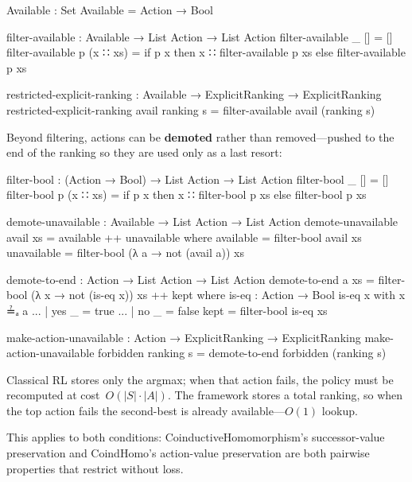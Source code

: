 \documentclass[9pt,a4paper]{article}
\theoremstyle{plain}
\theoremstyle{definition}
\theoremstyle{remark}
\begin{document}
\begin{code}
  Available : Set
  Available = Action → Bool

  filter-available : Available → List Action → List Action
  filter-available _ []       = []
  filter-available p (x ∷ xs) = 
    if p x then x ∷ filter-available p xs else filter-available p xs

  restricted-explicit-ranking : Available → ExplicitRanking → ExplicitRanking
  restricted-explicit-ranking avail ranking s = filter-available avail (ranking s)
\end{code}

\noindent Beyond filtering, actions can be \textbf{demoted} rather than removed---pushed to the end of the ranking so they are used only as a last resort:

\begin{code}
  filter-bool : (Action → Bool) → List Action → List Action
  filter-bool _ [] = []
  filter-bool p (x ∷ xs) =
    if p x then x ∷ filter-bool p xs else filter-bool p xs

  demote-unavailable : Available → List Action → List Action
  demote-unavailable avail xs = available ++ unavailable
    where
      available   = filter-bool avail xs
      unavailable = filter-bool (λ a → not (avail a)) xs
\end{code}

\begin{code}[hide]
  demote-to-end : Action → List Action → List Action
  demote-to-end a xs = filter-bool (λ x → not (is-eq x)) xs ++ kept
    where
      is-eq : Action → Bool
      is-eq x with x ≟ₐ a
      ... | yes _ = true
      ... | no  _ = false
      kept = filter-bool is-eq xs
\end{code}

\begin{code}
  make-action-unavailable : Action → ExplicitRanking → ExplicitRanking
  make-action-unavailable forbidden ranking s = demote-to-end forbidden (ranking s)
\end{code}

\noindent Classical RL stores only the argmax; when that action fails, the policy must be recomputed at cost~$O(|S| \cdot |A|)$.  The framework stores a total ranking, so when the top action fails the second-best is already available---$O(1)$ lookup.

This applies to both conditions: CoinductiveHomomorphism's successor-value preservation and CoindHomo's action-value preservation are both pairwise properties that restrict without loss.
\end{document}
